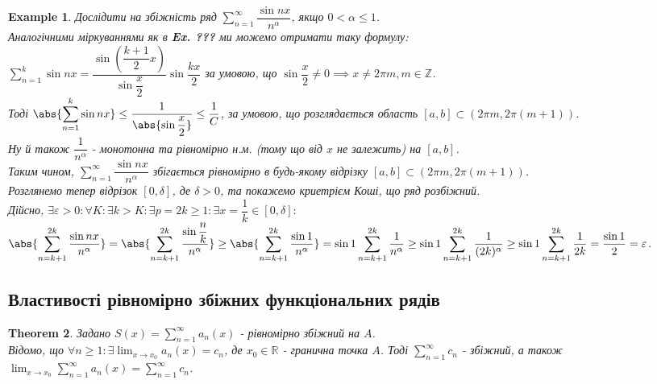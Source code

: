 \documentclass[a4paper, 10pt]{article}
\def\huge{\displaystyle}
\theoremstyle{theoremdd}
\newtheorem{theorem}{Theorem}[subsection]
\theoremstyle{theoremdd}
\theoremstyle{theoremdd}
\theoremstyle{theoremdd}
\theoremstyle{theoremdd}
\newtheorem{example}[theorem]{Example}
\theoremstyle{theoremdd}
\theoremstyle{theoremdd}
\theoremstyle{theoremdd}
\theoremstyle{theoremdd}
\begin{document}
\begin{example}
Дослідити на збіжність ряд $\huge\sum_{n=1}^\infty \dfrac{\sin nx}{n^\alpha}$, якщо $0 < \alpha \leq 1$.\\
Аналогічними міркуваннями як в \textbf{Ex. ???} ми можемо отримати таку формулу:\\
$\huge\sum_{n=1}^k \sin nx = \dfrac{\sin \left(\dfrac{k+1}{2}x \right)}{\sin \dfrac{x}{2}} \sin \dfrac{kx}{2}$ за умовою, що $\sin \dfrac{x}{2} \neq 0 \implies x \neq 2 \pi m, m \in \mathbb{Z}$.\\
Тоді $\abs{\huge\sum_{n=1}^k \sin n x} \leq \dfrac{1}{\abs{\sin \dfrac{x}{2}}} \leq \dfrac{1}{C}$, за умовою, що розглядається область $[a,b] \subset (2\pi m, 2 \pi (m+1))$.\\
Ну й також $\dfrac{1}{n^\alpha}$ - монотонна та рівномірно н.м. (тому що від $x$ не залежить) на $[a,b]$.\\
Таким чином, $\huge\sum_{n=1}^\infty \dfrac{\sin nx}{n^\alpha}$ збігається рівномірно в будь-якому відрізку $[a,b] \subset (2\pi m, 2 \pi (m+1))$.
\bigskip \\
Розглянемо тепер відрізок $[0,\delta]$, де $\delta > 0$, та покажемо криетрієм Коші, що ряд розбіжний.\\
Дійсно, $\exists \varepsilon > 0: \forall K: \exists k > K: \exists p = 2k \geq 1: \exists x = \dfrac{1}{k} \in [0,\delta]:$\\
$\huge\abs{\sum_{n=k+1}^{2k} \dfrac{\sin nx}{n^\alpha}} =\abs{\sum_{n=k+1}^{2k} \dfrac{\sin \dfrac{n}{k}}{n^\alpha}} \geq \abs{\sum_{n=k+1}^{2k} \dfrac{\sin 1}{n^\alpha}} = \sin 1 \sum_{n=k+1}^{2k} \dfrac{1}{n^\alpha} \geq \sin 1 \sum_{n=k+1}^{2k} \dfrac{1}{(2k)^\alpha} \geq \sin 1\sum_{n=k+1}^{2k} \dfrac{1}{2k} = \dfrac{\sin 1}{2} = \varepsilon$.
\end{example}

\subsection{Властивості рівномірно збіжних функціональних рядів}
\begin{theorem}
Задано $S(x) = \huge\sum_{n=1}^\infty a_n(x)$ - рівномірно збіжний на $A$.\\
Відомо, що $\forall n \geq 1: \exists \huge\lim_{x \to x_0} a_n(x) = c_n$, де $x_0 \in \mathbb{R}$ - гранична точка $A$. Тоді $\huge\sum_{n=1}^\infty c_n$ - збіжний, а також $\huge\lim_{x \to x_0} \sum_{n=1}^\infty a_n(x) = \sum_{n=1}^\infty c_n$.
\end{theorem}
\end{document}
